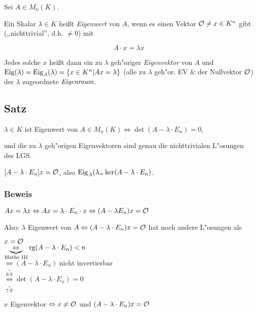Sei $A \in M_n(K)$.

Ein Skalar $\lambda \in K$ heißt \emph{Eigenwert} von $A$, wenn es einen Vektor $\mathcal{O} \neq x \in K^n$ gibt (,,nichttrivial'', d.h. $\neq 0$) mit

\[A\cdot x = \lambda x\]

Jedes solche $x$ heißt dann ein zu $\lambda$ geh"origer \emph{Eigenvektor} von $A$ und $\mathrm{ Eig }(\lambda)=\mathrm{ Eig }_A(\lambda)=\{x \in K^n | Ax=\lambda\}$ (alle zu $\lambda$ geh"or. EV \& der Nullvektor $\mathcal{O}$) der $\lambda$ zugeordnete $\emph{Eigenraum}$.

\subsection{Satz}

$\lambda \in K$ ist Eigenwert von $A \in M_n(K) \Leftrightarrow \det(A-\lambda \cdot E_n) = 0$,

und die zu $\lambda$ geh"origen Eigenvektoren sind genau die nichttrivialen L"osungen des LGS.

$[A - \lambda \cdot E_n] x = \mathcal{O}$, also $\mathrm{ Eig }_A(\lambda_ = \ker(A- \lambda \cdot E_n)$.

\subsubsection*{Beweis}

$Ax = \lambda x \Leftrightarrow Ax = \lambda \cdot E_n \cdot x \Leftrightarrow (A - \lambda E_n) x = \mathcal{O}$

Also: $\lambda$ Eigenwert von $A \Leftrightarrow (A- \lambda \cdot E_n)x = \mathcal{O}$ hat noch andere L"osungen als 

$x = \mathcal{O}$\\
$\underbrace{\Leftrightarrow}_{\text{Mathe III}} \mathrm{ rg }(A-\lambda \cdot E_n) < n$\\
$\underbrace{\Leftrightarrow}_{6.8}(A-\lambda \cdot E_n) \; \text{nicht invertierbar}$\\
$\underbrace{\Leftrightarrow}_{7.9}\det(A-\lambda \cdot E_n) = 0$

$x$ Eigenvektor $\Leftrightarrow x \neq \mathcal{O}$ und $(A- \lambda \cdot E_n) x = \mathcal{O}$


